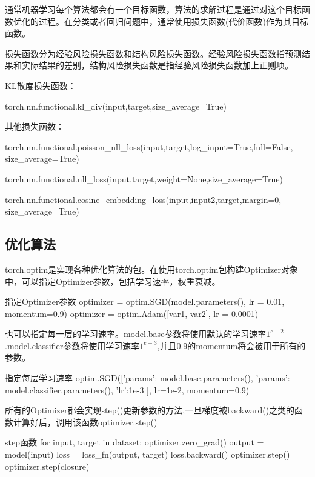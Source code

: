 \documentclass[openbib]{article}
\begin{document}
通常机器学习每个算法都会有一个目标函数，算法的求解过程是通过对这个目标函数优化的过程。在分类或者回归问题中，通常使用损失函数(代价函数)作为其目标函数。

损失函数分为经验风险损失函数和结构风险损失函数。经验风险损失函数指预测结果和实际结果的差别，结构风险损失函数是指经验风险损失函数加上正则项。

KL散度损失函数：

torch.nn.functional.kl\_div(input,target,size\_average=True)

其他损失函数：

torch.nn.functional.poisson\_nll\_loss(input,target,log\_input=True,full=False,\\size\_average=True)

torch.nn.functional.nll\_loss(input,target,weight=None,size\_average=True)

torch.nn.functional.cosine\_embedding\_loss(input,input2,target,margin=0,\\size\_average=True) 

\subsection{优化算法}
torch.optim是实现各种优化算法的包。在使用torch.optim包构建Optimizer对象中，可以指定Optimizer参数，包括学习速率，权重衰减。
\begin{Python}{指定Optimizer参数}
	optimizer = optim.SGD(model.parameters(), lr = 0.01, momentum=0.9)
	optimizer = optim.Adam([var1, var2], lr = 0.0001)
\end{Python}

也可以指定每一层的学习速率。model.base参数将使用默认的学习速率$1^{e-2}$.model.classifier参数将使用学习速率$1^{e-3}$,并且0.9的momentum将会被用于所有的参数。

\begin{Python}{指定每层学习速率}
	optim.SGD([{'params': model.base.parameters()},
	{'params': model.classifier.parameters(), 'lr':1e-3}
	], lr=1e-2, momentum=0.9)
\end{Python}

所有的Optimizer都会实现step()更新参数的方法,一旦梯度被backward()之类的函数计算好后，调用该函数optimizer.step()

\begin{Python}{step函数}
	for input, target in dataset:
	optimizer.zero_grad()
	output = model(input)
	loss = loss_fn(output, target)
	loss.backward()
	optimizer.step()
	optimizer.step(closure)
\end{Python}
\end{document}
